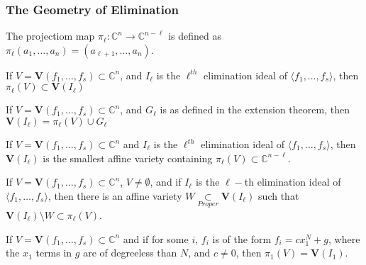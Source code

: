             \subsubsection{The Geometry of Elimination}
                \begin{definition}
                        The projectiom map
                        $\pi_{\ell}:\mathbb{C}^{n}\rightarrow\mathbb{C}^{n-\ell}$
                        is defined as
                        $\pi_{\ell}(a_{1},\hdots,a_{n})=(a_{\ell+1},\hdots,a_{n})$.
                \end{definition}
                \begin{theorem}
                        If $V=\mathbf{V}(f_{1},\hdots,f_{s})\subset\mathbb{C}^{n}$,
                        and $I_{\ell}$ is the $\ell^{th}$ elimination ideal of
                        $\langle{f_{1},\hdots,f_{s}}\rangle$,
                        then $\pi_{\ell}(V)\subset\textbf{V}(I_{\ell})$
                \end{theorem}
                \begin{theorem}
                        If $V=\mathbf{V}(f_{1},\hdots,f_{s})\subset\mathbb{C}^{n}$,
                        and $G_{\ell}$ is as defined in the extension theorem,
                        then $\textbf{V}(I_{\ell})=\pi_{\ell}(V)\cup{G_{\ell}}$
                \end{theorem}
                \begin{theorem}
                        If $V=\mathbf{V}(f_{1},\hdots,f_{s})\subset\mathbb{C}^{n}$
                        and $I_{\ell}$ is the $\ell^{th}$ elimination ideal of
                        $\langle{f_{1},\hdots,f_{s}}\rangle$, then
                        $\textbf{V}(I_{\ell})$ is the smallest affine variety
                        containing $\pi_{\ell}(V)\subset\mathbb{C}^{n-\ell}$.
                \end{theorem}
                \begin{theorem}
                If $V = \mathbf{V}(f_1,\hdots, f_s) \subset \mathbb{C}^n$, $V\ne \emptyset$, and if $I_{\ell}$ is the $\ell-$th elimination ideal of $\langle f_1,\hdots,f_s\rangle$, then there is an affine variety $W\underset{Proper}{\subset} \textbf{V}(I_{\ell})$ such that $\textbf{V}(I_{\ell})\setminus W \subset \pi_{\ell}(V)$.
                \end{theorem}
                \begin{theorem}
                If $V = \mathbf{V}(f_1,\hdots, f_s)\subset \mathbb{C}^n$ and if for some $i$, $f_i$ is of the form $f_i = cx_1^N + g$, where the $x_1$ terms in $g$ are of degreeless than $N$, and $c\ne 0$, then $\pi_{1}(V) = \textbf{V}(I_{1})$.
                \end{theorem}
